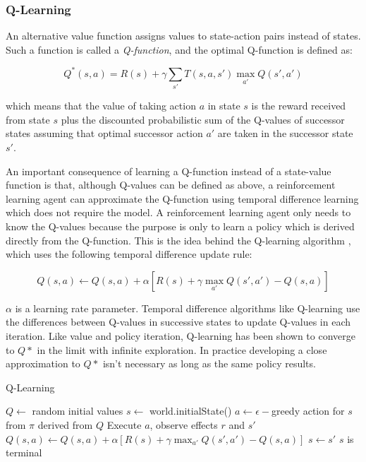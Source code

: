 \subsubsection{Q-Learning}

An alternative value function assigns values to state-action pairs instead of states. Such a function is called a {\it Q-function}, and the optimal Q-function is defined as:

\begin{equation}
Q^*(s, a) = R(s) + \gamma \sum_{s'} T(s, a, s') \max_{a'} Q(s', a')
\end{equation}

which means that the value of taking action $a$ in state $s$ is the reward received from state $s$ plus the discounted probabilistic sum of the Q-values of successor states assuming that optimal successor action $a'$ are taken in the successor state $s'$.

An important consequence of learning a Q-function instead of a state-value function is that, although Q-values can be defined as above, a reinforcement learning agent can approximate the Q-function using temporal difference learning which does not require the model. A reinforcement learning agent only needs to know the Q-values because the purpose is only to learn a policy which is derived directly from the Q-function. This is the idea behind the Q-learning algorithm \cite{watkins1989models}, which uses the following temporal difference update rule:

\begin{equation}\label{eqn:q-update}
Q(s, a) \leftarrow Q(s, a) + \alpha [R(s) + \gamma \max_{a'} Q(s', a') - Q(s, a)]
\end{equation}

$\alpha$ is a learning rate parameter. Temporal difference algorithms like Q-learning use the differences between Q-values in successive states to update Q-values in each iteration. Like value and policy iteration, Q-learning has been shown to converge to $Q*$ in the limit with infinite exploration. In practice developing a close approximation to $Q*$ isn't necessary as long as the same policy results.

\begin{algorithm}
  \caption{Q-Learning}\label{alg:q-learning}
  \begin{algorithmic}
    \State $Q \gets$ random initial values
      \State $s \gets$ world.initialState()
      \Repeat
        \State $a \gets \epsilon-$greedy action for $s$ from $\pi$ derived from $Q$
        \State Execute $a$, observe effects $r$ and $s'$
        \State $Q(s, a) \gets Q(s, a) + \alpha [R(s) + \gamma \max_{a'} Q(s', a') - Q(s, a)]$
        \State $s \gets s'$
      \Until $s$ is terminal
    \EndFor
  \end{algorithmic}
\end{algorithm}


